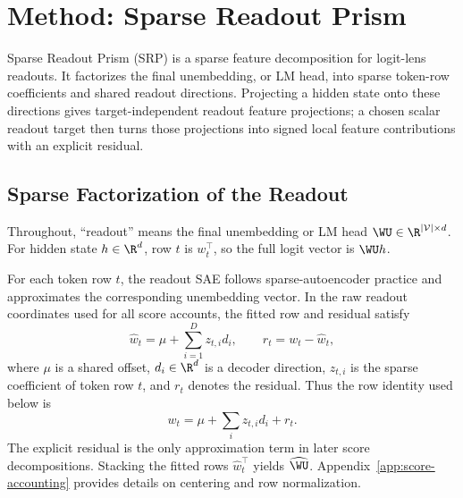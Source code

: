 \section{Method: Sparse Readout Prism}
\label{sec:method}

Sparse Readout Prism (SRP) is a sparse feature decomposition for logit-lens
readouts. It factorizes the final unembedding, or LM head, into sparse
token-row coefficients and shared readout directions. Projecting a hidden state
onto these directions gives target-independent readout feature projections; a
chosen scalar readout target then turns those projections into signed local
feature contributions with an explicit residual.

\subsection{Sparse Factorization of the Readout}
\label{sec:method-factorization}

Throughout, ``readout'' means the final unembedding or LM head
\(\WU\in\R^{|\mathcal{V}|\times d}\). For hidden state \(h\in\R^d\), row \(t\)
is \(w_t^\top\), so the full logit vector is \(\WU h\).

For each token row \(t\), the readout SAE follows sparse-autoencoder practice
\citep{bricken2023monosemanticity,cunningham2023sparse,gao2024scaling} and
approximates the corresponding unembedding vector. In the raw readout
coordinates used for all score accounts, the fitted row and residual satisfy
\[
    \widehat{w}_t = \mu + \sum_{i=1}^{D} z_{t,i} d_i,
    \qquad
    r_t = w_t-\widehat{w}_t,
\]
where \(\mu\) is a shared offset, \(d_i\in\R^d\) is a decoder direction,
\(z_{t,i}\) is the sparse coefficient of token row \(t\), and \(r_t\) denotes
the residual. Thus the row identity used below is
\[
    w_t=\mu+\sum_i z_{t,i}d_i+r_t .
\]
The explicit residual is the only approximation term in later score
decompositions. Stacking the fitted rows \(\widehat{w}_t^\top\) yields
\(\widehat{\WU}\). Appendix~\ref{app:score-accounting} provides details on
centering and row normalization.

